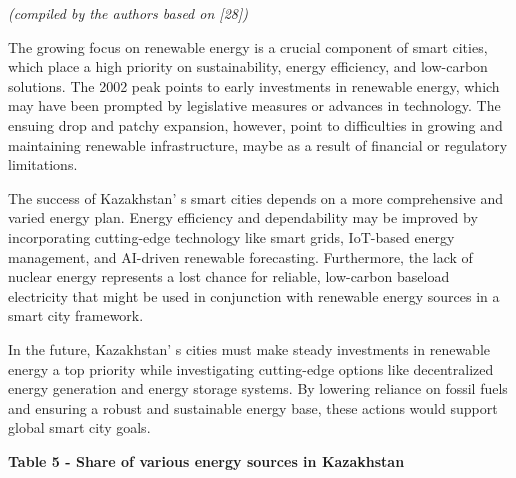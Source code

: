{\emph{(compiled by the authors based on {[}28{]})}

The growing focus on renewable energy is a crucial component of smart
cities, which place a high priority on sustainability, energy
efficiency, and low-carbon solutions. The 2002 peak points to early
investments in renewable energy, which may have been prompted by
legislative measures or advances in technology. The ensuing drop and
patchy expansion, however, point to difficulties in growing and
maintaining renewable infrastructure, maybe as a result of financial or
regulatory limitations.

The success of Kazakhstan' s smart cities depends on a
more comprehensive and varied energy plan. Energy efficiency and
dependability may be improved by incorporating cutting-edge technology
like smart grids, IoT-based energy management, and AI-driven renewable
forecasting. Furthermore, the lack of nuclear energy represents a lost
chance for reliable, low-carbon baseload electricity that might be used
in conjunction with renewable energy sources in a smart city framework.

In the future, Kazakhstan' s cities must make steady
investments in renewable energy a top priority while investigating
cutting-edge options like decentralized energy generation and energy
storage systems. By lowering reliance on fossil fuels and ensuring a
robust and sustainable energy base, these actions would support global
smart city goals.

{\bfseries Table 5 - Share of various energy sources in Kazakhstan}

}
